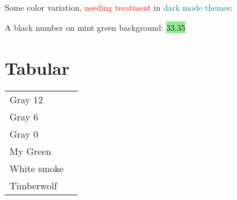 \documentclass{article}
\begin{document}
Some color variation, \textcolor{red}{needing treatment} in \textcolor{teal}{dark mode themes}:

A black number on mint green background: \colorbox{LightGreen}{33.35}

\section{Tabular}

\begin{tabular}{ll}
\rowcolor{gray!12} Gray 12 &  \hspace{10cm} \\
\rowcolor{gray!6} Gray 6 &  \hspace{10cm} \\
\rowcolor{gray!0} Gray 0 &  \hspace{10cm} \\
\rowcolor{mygreen} My Green &  \hspace{10cm} \\
\rowcolor{whitesmoke} White smoke &  \hspace{10cm} \\
\rowcolor{timberwolf} Timberwolf &  \hspace{10cm} \\
\end{tabular}
\end{document}
